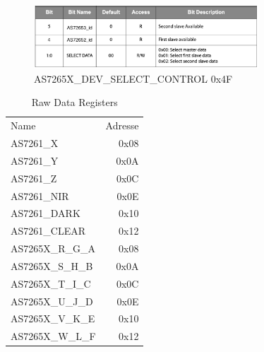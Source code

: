 \begin{figure}[H]
\centering
\includegraphics[width=0.75\textwidth]{img/AS7265X_DEV_SELECT_CONTROL}
\caption{AS7265X\_DEV\_SELECT\_CONTROL 0x4F\cite{Datenblatt_AS7261}}

\label{fig:AS7265X_DEV_SELECT_CONTROL}
\end{figure}

\begin{table}[!ht]
\centering
\caption{Raw Data Registers \cite{Datenblatt_AS7261}}
\begin{tabular}{ l r }
 Name & Adresse\\ 
AS7261\_X & 0x08\\
AS7261\_Y & 0x0A\\
AS7261\_Z & 0x0C\\
AS7261\_NIR & 0x0E\\
AS7261\_DARK & 0x10\\
AS7261\_CLEAR & 0x12\\
AS7265X\_R\_G\_A & 0x08 \\
AS7265X\_S\_H\_B & 0x0A \\
AS7265X\_T\_I\_C & 0x0C \\
AS7265X\_U\_J\_D & 0x0E \\
AS7265X\_V\_K\_E & 0x10 \\
AS7265X\_W\_L\_F & 0x12 \\
\end{tabular}
\label{fig:raw_channel_registers}
\end{table}

